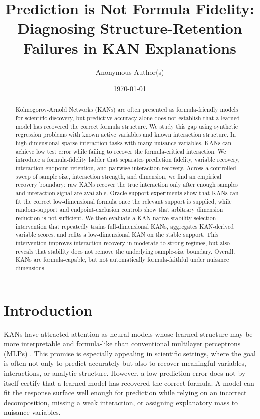 \documentclass[11pt]{article}
\title{Prediction is Not Formula Fidelity:\\
Diagnosing Structure-Retention Failures in KAN Explanations}
\author{Anonymous Author(s)}
\date{\today}
\begin{document}
\maketitle

\begin{abstract}
Kolmogorov-Arnold Networks (KANs) are often presented as formula-friendly models for scientific discovery, but predictive accuracy alone does not establish that a learned model has recovered the correct formula structure. We study this gap using synthetic regression problems with known active variables and known interaction structure. In high-dimensional sparse interaction tasks with many nuisance variables, KANs can achieve low test error while failing to recover the formula-critical interaction. We introduce a formula-fidelity ladder that separates prediction fidelity, variable recovery, interaction-endpoint retention, and pairwise interaction recovery. Across a controlled sweep of sample size, interaction strength, and dimension, we find an empirical recovery boundary: raw KANs recover the true interaction only after enough samples and interaction signal are available. Oracle-support experiments show that KANs can fit the correct low-dimensional formula once the relevant support is supplied, while random-support and endpoint-exclusion controls show that arbitrary dimension reduction is not sufficient. We then evaluate a KAN-native stability-selection intervention that repeatedly trains full-dimensional KANs, aggregates KAN-derived variable scores, and refits a low-dimensional KAN on the stable support. This intervention improves interaction recovery in moderate-to-strong regimes, but also reveals that stability does not remove the underlying sample-size boundary. Overall, KANs are formula-capable, but not automatically formula-faithful under nuisance dimensions.
\end{abstract}

\section{Introduction}

KANs have attracted attention as neural models whose learned structure may be more interpretable and formula-like than conventional multilayer perceptrons (MLPs) \citep{liu2024kan,liu2024kan2}. This promise is especially appealing in scientific settings, where the goal is often not only to predict accurately but also to recover meaningful variables, interactions, or analytic structure. However, a low prediction error does not by itself certify that a learned model has recovered the correct formula. A model can fit the response surface well enough for prediction while relying on an incorrect decomposition, missing a weak interaction, or assigning explanatory mass to nuisance variables.
\end{document}
